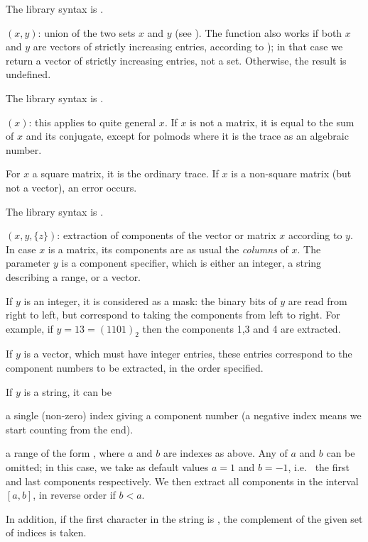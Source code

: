 The library syntax is .

$(x,y)$: \label{se:setunion}union of the two sets $x$ and $y$ (see ).
The function also works if both $x$ and $y$ are vectors of strictly increasing
entries, according to \kbd{<}); in that case we return a vector of strictly
increasing entries, not a set. Otherwise, the result is undefined.

The library syntax is .

$(x)$: \label{se:trace}this applies to quite general $x$. If $x$ is not a
matrix, it is equal to the sum of $x$ and its conjugate, except for polmods
where it is the trace as an algebraic number.

For $x$ a square matrix, it is the ordinary trace. If $x$ is a
non-square matrix (but not a vector), an error occurs.

The library syntax is .

$(x,y,\{z\})$: \label{se:vecextract}extraction of components of the
vector or matrix $x$ according to $y$. In case $x$ is a matrix, its
components are as usual the \emph{columns} of $x$. The parameter $y$ is a
component specifier, which is either an integer, a string describing a
range, or a vector.

If $y$ is an integer, it is considered as a mask: the binary bits of $y$ are
read from right to left, but correspond to taking the components from left to
right. For example, if $y=13=(1101)_2$ then the components 1,3 and 4 are
extracted.

If $y$ is a vector, which must have integer entries, these entries correspond
to the component numbers to be extracted, in the order specified.

If $y$ is a string, it can be

\item a single (non-zero) index giving a component number (a negative
index means we start counting from the end).

\item a range of the form , where $a$ and $b$ are
indexes as above. Any of $a$ and $b$ can be omitted; in this case, we take
as default values $a = 1$ and $b = -1$, i.e.~ the first and last components
respectively. We then extract all components in the interval $[a,b]$, in
reverse order if $b < a$.

In addition, if the first character in the string is \kbd{\pow}, the
complement of the given set of indices is taken.

